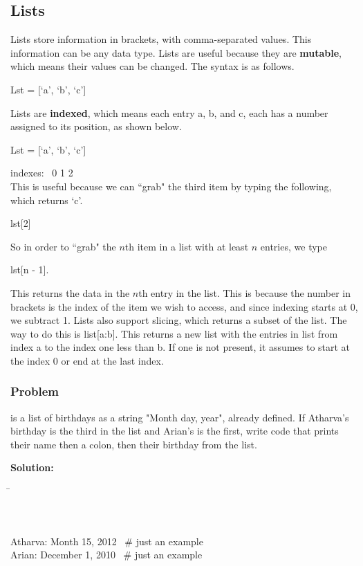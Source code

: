 \documentclass{article}
\newcommand{\define}[1]{\begin{center}\ttfamily #1\end{center}}
\newcommand{\icode}[1]{{\ttfamily #1}}
\begin{document}
\subsection{Lists}
Lists store information in brackets, with comma-separated values. This information can be any data type. Lists are useful because they are \textbf{mutable}, which means their values can be changed. The syntax is as follows.
\define{Lst = [`a', `b', `c']}
Lists are \textbf{indexed}, which means each entry a, b, and c, each has a number assigned to its position, as shown below.
\define{Lst = [`a', `b', `c']}
\hspace{6.32 cm}indexes: \ 0 \hspace{.5 cm} 1 \hspace{.5 cm} 2\\
This is useful because we can ``grab" the third item by typing the following, which returns {\ttfamily `c'}.
\define{lst[2]}
So in order to ``grab" the $n$th item in a list with at least $n$ entries, we type
\define{lst[n - 1].}
This returns the data in the $n$th entry in the list. This is because the number in brackets is the index of the item we wish to access, and since indexing starts at 0, we subtract 1. Lists also support slicing, which returns a subset of the list. The way to do this is \icode{list[a:b]}. This returns a new list with the entries in \icode{list} from index \icode{a} to the index one less than \icode{b}. If one is not present, it assumes to start at the index 0 or end at the last index. 

\subsubsection{Problem}
 is a list of birthdays as a string \icode{"Month day, year"}, already defined. If Atharva's birthday is the third in the list and Arian's is the first, write code that prints their name then a colon, then their birthday from the list.
\vspace{1 mm}

\noindent\textbf{Solution:}
\begin{tcolorbox}
	\ttfamily
	\begin{tabbing}
		\hspace{3.25 in}\=\hspace{3.25 in} \kill
		\phantom{Bdays = ["December 1, 2010", "April 30, 2011", "June 15, 2012", "January 1, 2013"]}\>\\ %
		\phantom{print("Atharva: " + Bdays[2])}\>\\
		\phantom{print("Arian: " + Bdays[0])}\>\\
	\end{tabbing}
\end{tcolorbox}
\begin{tcolorbox}[colback=output]
	\ttfamily Atharva: Month 15, 2012 \ \# just an example\\
	Arian: December 1, 2010 \ \# just an example
\end{tcolorbox}
\vspace{.5 cm}
\end{document}
